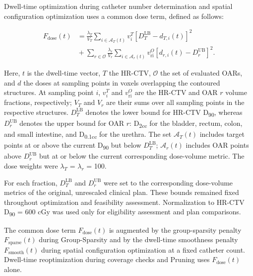 \documentclass[12pt,twoside,letterpaper]{article}
\begin{document}
Dwell-time optimization during catheter number determination and spatial configuration optimization uses a common dose term, defined as follows:

\begin{equation}\label{eq:1}
\begin{aligned}F_{\text{dose}}\left( t \right) &= \frac{\lambda_{T}}{V_{T}}\sum_{i \in \mathcal{A}_{T}\left( t \right)}^{}{v_{i}^{T}\left\lbrack D_{T}^{\text{LB}} - d_{T,i}(t) \right\rbrack^{2}}\\ &{}+\sum_{r \in \mathcal{O}}^{}{\frac{\lambda_{r}}{V_{r}}\sum_{i \in \mathcal{A}_{r}\left( t \right)}^{}{v_{\text{ri}}^{O}\left\lbrack d_{r,i}\left( t \right) - D_{r}^{\text{UB}} \right\rbrack^{2}}}.\end{aligned}
\end{equation}

Here, $t$ is the dwell-time vector, $T$ the HR-CTV, $\mathcal{O}$ the set of evaluated OARs, and $d$ the doses at sampling points in voxels overlapping the contoured structures. At sampling point $i$, $v_{i}^{T}$ and $v_{\text{ri}}^{O}$ are the HR-CTV and OAR $r$ volume fractions, respectively; $V_{T}$ and $V_{r}$ are their sums over all sampling points in the respective structures. $D_{T}^{\text{LB}}$ denotes the lower bound for HR-CTV D\textsubscript{90}, whereas $D_{r}^{\text{UB}}$ denotes the upper bound for OAR $r$: D\textsubscript{2cc} for the bladder, rectum, colon, and small intestine, and D\textsubscript{0.1cc} for the urethra. The set $\mathcal{A}_{T}\left( t \right)$ includes target points at or above the current D\textsubscript{90} but below $D_{T}^{\text{LB}}$; $\mathcal{A}_{r}\left( t \right)$ includes OAR points above $D_{r}^{\text{UB}}$ but at or below the current corresponding dose-volume metric. The dose weights were $\lambda_{T}$ = $\lambda_{r}$ = 100.

For each fraction, $D_{T}^{\text{LB}}$ and $D_{r}^{\text{UB}}$ were set to the corresponding dose-volume metrics of the original, unrescaled clinical plan. These bounds remained fixed throughout optimization and feasibility assessment. Normalization to HR-CTV D\textsubscript{90} = 600 cGy was used only for eligibility assessment and plan comparisons.

The common dose term $F_{\text{dose}}\left( t \right)$ is augmented by the group-sparsity penalty $F_{\text{sparse}}\left( t \right)$ during Group-Sparsity and by the dwell-time smoothness penalty $F_{\text{smooth}}\left( t \right)$ during spatial configuration optimization at a fixed catheter count. Dwell-time reoptimization during coverage checks and Pruning uses $F_{\text{dose}}\left( t \right)$ alone.
\end{document}
